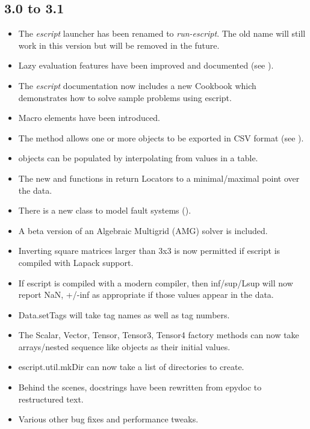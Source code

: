 \subsection*{3.0 to 3.1}
\begin{itemize}
\item The \emph{escript} launcher has been renamed to \emph{run-escript}. The
    old name will still work in this version but will be removed in the future.
\item Lazy evaluation features have been improved and documented (see ).
\item The \emph{escript} documentation now includes a new Cookbook which
    demonstrates how to solve sample problems using escript.
\item Macro elements have been introduced.
\item The  method allows one or more \Data objects to be
    exported in CSV format (see ).
\item \Data objects can be populated by interpolating from values in a table.
\item The new  and  functions in
    \pdetools return Locators to a minimal/maximal point over the
    data.
\item There is a new class to model fault systems ().
\item A beta version of an Algebraic Multigrid (AMG) solver is included.
\item Inverting square matrices larger than 3x3 is now permitted if escript is
    compiled with Lapack support.
\item If escript is compiled with a modern compiler, then inf/sup/Lsup will now
    report NaN, +/-inf as appropriate if those values appear in the data.
\item Data.setTags will take tag names as well as tag numbers.
\item The Scalar, Vector, Tensor, Tensor3, Tensor4 factory methods can now take
    arrays/nested sequence like objects as their initial values.
\item escript.util.mkDir can now take a list of directories to create.
\item Behind the scenes, \PYTHON docstrings have been rewritten from epydoc to
    restructured text.
\item Various other bug fixes and performance tweaks.
\end{itemize}

